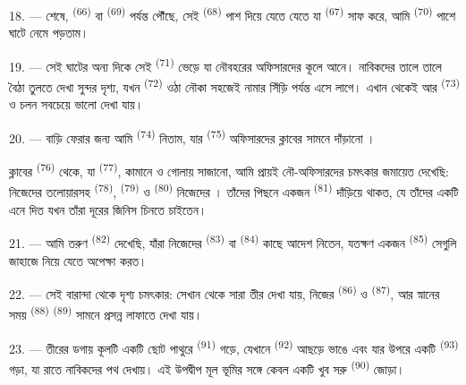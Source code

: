 18. --- শেষে,  \textsuperscript{(66)} বা 
\textsuperscript{(69)} পর্যন্ত পৌঁছে, সেই 
\textsuperscript{(68)} পাশ দিয়ে যেতে যেতে যা  \textsuperscript{(67)}
সাফ করে, আমি  \textsuperscript{(70)} পাশে ঘাটে নেমে
পড়তাম।

19. --- সেই ঘাটের অন্য দিকে সেই  \textsuperscript{(71)}
ভেড়ে যা নৌবহরের অফিসারদের কূলে আনে। নাবিকদের তালে তালে বৈঠা তুলতে দেখা সুন্দর
দৃশ্য, যখন  \textsuperscript{(72)} ওঠা নৌকা সহজেই নামার সিঁড়ি
পর্যন্ত এসে লাগে। এখান থেকেই  আর 
\textsuperscript{(73)}  ও  চলন সবচেয়ে ভালো দেখা
যায়।

\VUsaut{3.0mm}
\VUsaut{3.0mm}

20. --- বাড়ি ফেরার জন্য আমি  \textsuperscript{(74)}
নিতাম, যার  \textsuperscript{(75)} অফিসারদের ক্লাবের সামনে
দাঁড়ানো ।

ক্লাবের  \textsuperscript{(76)} থেকে, যা 
\textsuperscript{(77)}, কামানে ও গোলায় সাজানো, আমি প্রায়ই নৌ-অফিসারদের
চমৎকার জমায়েত দেখেছি: নিজেদের তলোয়ারসহ 
\textsuperscript{(78)},  \textsuperscript{(79)} ও
 \textsuperscript{(80)}  নিজেদের
। তাঁদের পিছনে একজন  \textsuperscript{(81)}
দাঁড়িয়ে থাকত, যে তাঁদের একটি  এনে দিত যখন তাঁরা দূরের জিনিস
চিনতে চাইতেন।

21. --- আমি তরুণ  \textsuperscript{(82)} দেখেছি, যাঁরা
নিজেদের  \textsuperscript{(83)} বা 
\textsuperscript{(84)} কাছে আদেশ নিতেন, যতক্ষণ একজন 
\textsuperscript{(85)} সেগুলি জাহাজে নিয়ে যেতে অপেক্ষা করত।

22. --- সেই বারান্দা থেকে দৃশ্য চমৎকার: সেখান থেকে সারা তীর দেখা যায়, নিজের
 \textsuperscript{(86)} ও 
\textsuperscript{(87)}, আর স্নানের সময় 
\textsuperscript{(88)}  \textsuperscript{(89)} সামনে প্রসন্ন
লাফাতে দেখা যায়।

23. --- তীরের ডগায় কূলটি একটি ছোট পাথুরে 
\textsuperscript{(91)} গড়ে, যেখানে  \textsuperscript{(92)} আছড়ে
ভাঙে এবং যার উপরে একটি  \textsuperscript{(93)} গড়া, যা রাতে
নাবিকদের পথ দেখায়। এই উপদ্বীপ মূল ভূমির সঙ্গে কেবল একটি খুব সরু
 \textsuperscript{(90)} জোড়া।

